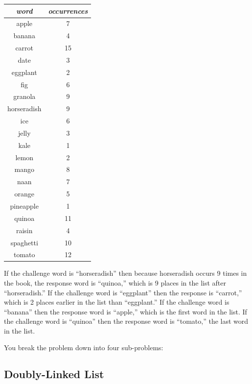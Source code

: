 \begin{center}
\begin{tabular}{cc}
\textit{word} & \textit{occurrences} \\ \hline
apple       & 7 \\
banana      & 4 \\
carrot      & 15 \\
date        & 3 \\
eggplant    & 2 \\
fig         & 6 \\
granola     & 9 \\
horseradish & 9 \\
ice         & 6 \\
jelly       & 3 \\
kale        & 1 \\
lemon       & 2 \\
mango       & 8 \\
naan        & 7 \\
orange      & 5 \\
pineapple   & 1 \\
quinoa      & 11 \\
raisin      & 4 \\
spaghetti   & 10 \\
tomato      & 12 \\
\end{tabular}
\end{center}
If the challenge word is ``horseradish'' then because horseradish occurs 9
times in the book, the response word is ``quinoa,'' which is 9 places in the
list after ``horseradish.'' If the challenge word is ``eggplant'' then the
response is ``carrot,'' which is 2 places earlier in the list than
``eggplant.'' If the challenge word is ``banana'' then the response word is
``apple,'' which is the first word in the list. If the challenge word is
``quinoa'' then the response word is ``tomato,'' the last word in the list.

You break the problem down into four sub-problems:

\subsection{Doubly-Linked List}

